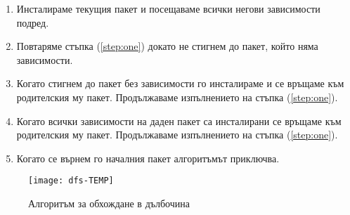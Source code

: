 \begin{enumerate}
    \item \label{step:one} Инсталираме текущия пакет и посещаваме всички негови
          зависимости подред.
    \item Повтаряме стъпка (\ref{step:one}) докато не стигнем до пакет, който
          няма зависимости.
    \item Когато стигнем до пакет без зависимости го инсталираме и се връщаме
          към родителския му пакет. Продължаваме изпълнението на стъпка
          (\ref{step:one}).
    \item Когато всички зависимости на даден пакет са инсталирани се връщаме към
          родителския му пакет. Продължаваме изпълнението на стъпка
          (\ref{step:one}).
    \item Когато се върнем го началния пакет алгоритъмът приключва.
\end{enumerate}

\begin{figure}[h]
    \centering
    \texttt{[image: dfs-TEMP]}
    \caption{Алгоритъм за обхождане в дълбочина}
    \label{fig:dfs}
\end{figure}
